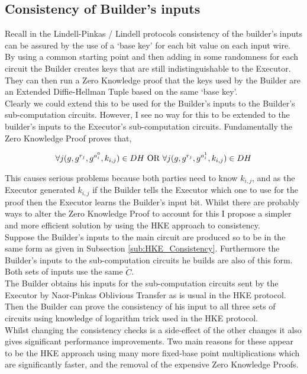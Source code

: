 \documentclass[ %
                    author={Nicholas Tutte},
                supervisor={Prof. Nigel Smart},
                    degree={MEng},
                     title={Secure Two Party Computation},
                  subtitle={A practical comparison of recent protocols},
                      type={Research - GG1K},
                      year={2015} ]{dissertation}
\begin{document}
			\subsection{Consistency of Builder's inputs}
				Recall in the Lindell-Pinkas / Lindell protocols consistency of the builder's inputs can be assured by the use of a `base key' for each bit value on each input wire. By using a common starting point and then adding in some randomness for each circuit the Builder creates keys that are still indistinguishable to the Executor. They can then run a Zero Knowledge proof that the keys used by the Builder are an Extended Diffie-Hellman Tuple based on the same `base key'.\\

				Clearly we could extend this to be used for the Builder's inputs to the Builder's sub-computation circuits. However, I see no way for this to be extended to the builder's inputs to the Executor's sub-computation circuits. Fundamentally the Zero Knowledge Proof proves that,
				
				$$\forall j (g, g^{r_j}, g^{a_i^0}, k_{i,j}) \in DH \textnormal{ OR } \forall j (g, g^{r_j}, g^{a_i^1}, k_{i,j}) \in DH$$
				
				This causes serious problems because both parties need to know $k_{i,j}$, and as the Executor generated $k_{i,j}$ if the Builder tells the Executor which one to use for the proof then the Executor learns the Builder's input bit. Whilst there are probably ways to alter the Zero Knowledge Proof to account for this I propose a simpler and more efficient solution by using the HKE approach to consistency.\\

				Suppose the Builder's inputs to the main circuit are produced so to be in the same form as given in Subsection \ref{sub:HKE_Consistency}. Furthermore the Builder's inputs to the sub-computation circuits he builds are also of this form. Both sets of inputs use the same $\tilde C$.\\

				The Builder obtains his inputs for the sub-computation circuits sent by the Executor by Naor-Pinkas Oblivious Transfer as is usual in the HKE protocol. Then the Builder can prove the consistency of his input to all three sets of circuits using knowledge of logarithm trick used in the HKE protocol.\\

				Whilst changing the consistency checks is a side-effect of the other changes it also gives significant performance improvements. Two main reasons for these appear to be the HKE approach using many more fixed-base point multiplications which are significantly faster, and the removal of the expensive Zero Knowledge Proofs.\\
\end{document}
